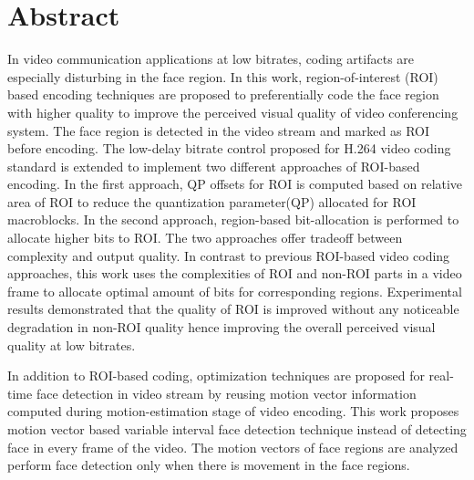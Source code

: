 
\thispagestyle{plain}

\section*{Abstract}
In video communication applications at low bitrates, coding artifacts are especially disturbing in the face region. In this work, region-of-interest (ROI) based encoding techniques are proposed to preferentially code the face region with higher quality to improve the perceived visual quality of video conferencing system. The face region is detected in the video stream and marked as ROI before encoding. The low-delay bitrate control proposed for H.264 video coding standard is extended to implement two different approaches of ROI-based encoding. In the first approach, QP offsets for ROI is computed based on relative area of ROI to reduce the quantization parameter(QP) allocated for ROI macroblocks. In the second approach, region-based bit-allocation is performed to allocate higher bits to ROI. The two approaches offer tradeoff between complexity and output quality. In contrast to previous ROI-based video coding approaches, this work uses the complexities of ROI and non-ROI parts in a video frame to allocate optimal amount of bits for corresponding regions. Experimental results demonstrated that the quality of ROI is improved without any noticeable degradation in non-ROI quality hence improving the overall perceived visual quality at low bitrates.

In addition to ROI-based coding, optimization techniques are proposed for real-time face detection in video stream by reusing motion vector information computed during motion-estimation stage of video encoding. This work proposes motion vector based variable interval face detection technique instead of detecting face in every frame of the video. The motion vectors of face regions are analyzed perform face detection only when there is movement in the face regions.

